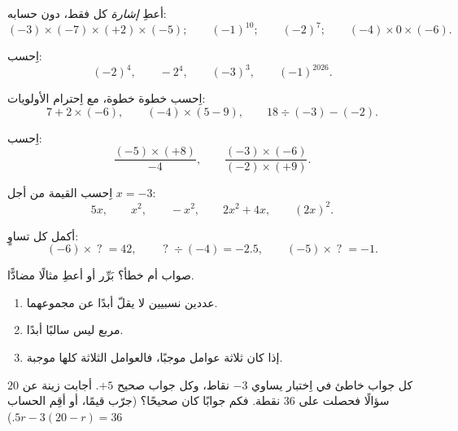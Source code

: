 \begin{exercise}[$\star$]\label{exo:g8:negprod:3}
أعطِ \emph{إشارة} كل  فقط، دون حسابه:
\[
(-3) \times (-7) \times (+2) \times (-5); \qquad
(-1)^{10}; \qquad
(-2)^{7}; \qquad
(-4) \times 0 \times (-6).
\]
\end{exercise}

\begin{exercise}[$\star$]\label{exo:g8:negprod:4}
اِحسب:
\[
(-2)^4, \qquad
-2^4, \qquad
(-3)^3, \qquad
(-1)^{2026} .
\]
\end{exercise}

\begin{exercise}[$\star$]\label{exo:g8:negprod:5}
اِحسب خطوة خطوة، مع اِحترام الأولويات:
\[
7 + 2 \times (-6), \qquad
(-4) \times (5 - 9), \qquad
18 \div (-3) - (-2) .
\]
\end{exercise}

\begin{exercise}[$\star$]\label{exo:g8:negprod:6}
اِحسب:
\[
\frac{(-5) \times (+8)}{-4}, \qquad
\frac{(-3) \times (-6)}{(-2) \times (+9)} .
\]
\end{exercise}

\begin{exercise}[$\star$]\label{exo:g8:negprod:7}
اِحسب القيمة من أجل $x = -3$:
\[
5x, \qquad x^2, \qquad -x^2, \qquad 2x^2 + 4x, \qquad (2x)^2 .
\]
\end{exercise}

\begin{exercise}[$\star\star$]\label{exo:g8:negprod:8}
أكمل كل تساوٍ:
\[
(-6) \times \;?\; = 42, \qquad
\;?\; \div (-4) = -2.5, \qquad
(-5) \times \;?\; = -1 .
\]
\end{exercise}

\begin{exercise}[$\star\star$]\label{exo:g8:negprod:9}
صواب أم خطأ؟ بَرِّر أو أعطِ مثالًا مضادًّا.
\begin{enumerate}
  \item {} عددين نسبيين لا يقلّ أبدًا عن
        مجموعهما.
  \item مربع  ليس سالبًا أبدًا.
  \item إذا كان  ثلاثة عوامل موجبًا، فالعوامل الثلاثة
        كلها موجبة.
\end{enumerate}
\end{exercise}

\begin{exercise}[$\star\star$]\label{exo:g8:negprod:10}
كل جواب خاطئ في اِختبار يساوي $-3$ نقاط، وكل جواب صحيح
$+5$. أجابت زينة عن $20$ سؤالًا فحصلت على $36$ نقطة. فكم
جوابًا كان صحيحًا؟ (جرّب قيمًا، أو أقِم الحساب
$5r - 3(20 - r) = 36$.)
\end{exercise}

